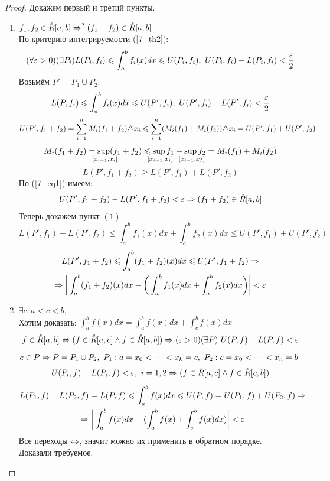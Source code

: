 \begin{proof}
	Докажем первый и третий пункты.\\
	\begin{enumerate}
	\item $f_1,f_2\in\mathring R[a,b]\Rightarrow^?(f_1+f_2)\in\mathring R[a,b]$\\
	По критерию интегрируемости (\ref{7_th2}):
	\[(\forall\eps>0)(\exists P_i)L(P_i,f_i)\le\int_a^bf_i(x)dx\le U(P_i,f_i),\ U(P_i,f_i)-L(P_i,f_i)<\frac\eps2\] 
	Возьмём $P'=P_1\cup P_2$.
	\begin{equation}\label{7_eq1}
		L(P,f_i)\le\int_a^bf_i(x)dx\le U(P',f_i),\ U(P',f_i)-L(P',f_i)<\frac\eps2\\
	\end{equation}
	\[U(P',f_1+f_2)=\sum_{i=1}^nM_i(f_1+f_2)\tr x_i\le\sum_{i=1}^n(M_i(f_1)+M_i(f_2))\tr x_i=U(P',f_1)+U(P',f_2)\]
	\[M_i(f_1+f_2)=\smo{\sup_{\hspace{0.1cm}[x_{i-1},x_i]}}(f_1+f_2)\le\smo{\sup_{\hspace{0.1cm}[x_{i-1},x_i]}}f_1+\smo{\sup_{\hspace{0.1cm}[x_{i-1},x_I]}}f_2=M_i(f_1)+M_i(f_2)\]
	\[L(P',f_1+f_2)\ge L(P',f_1)+L(P',f_2)\]
	По (\ref{7_eq1}) имеем:
	\[U(P',f_1+f_2)-L(P',f_1+f_2)<\varepsilon\Rightarrow (f_1+f_2)\in\mathring R[a,b]\]
	Теперь докажем пункт $(1)$.\\
	\[L(P',f_1)+L(P',f_2)\le\int_a^bf_1(x)dx+\int_a^bf_2(x)dx\le U(P',f_1)+U(P',f_2)\]
	\begin{multline*}
		L(P',f_1+f_2)\leqslant\int_a^b(f_1+f_2)(x)dx\leqslant U(P',f_1+f_2)\Rightarrow\\
		\Rightarrow\bigg|\int_a^b(f_1+f_2)(x)dx-\bigg(\int_a^bf_1(x)dx+\int_a^bf_2(x)dx\bigg)\bigg|<\varepsilon
	\end{multline*}
	\item[3.] $\exists c: a<c<b,$\\ 
	Хотим доказать: $\displaystyle\int_a^bf(x)dx=\int_a^bf(x)dx+\int_c^bf(x)dx$
	\[f\in\mathring R[a,b]\Leftrightarrow(f\in\mathring R[a,c]\land f\in\mathring R[a,b])\Rightarrow(\varepsilon>0)(\exists P)\ U(P,f)-L(P,f)<\varepsilon\]
	$c\in P\Ra P=P_1\cup P_2,\ P_1:a=x_0<\dots<x_k=c,\ P_2:c=x_0<\dots<x_n=b$\\
	\[U(P_i,f)-L(P_i,f)<\varepsilon,\ i=1,2\Rightarrow (f\in\mathring R[a,c]\land f\in\mathring R[c,b])\]
	\begin{multline*}
		L(P_1,f)+L(P_2,f)=L(P,f)\leqslant\int_a^bf(x)dx\leqslant U(P,f)=U(P_1,f)+U(P_2,f)\Rightarrow\\
		\Rightarrow\bigg|\int_a^bf(x)dx-(\int_a^bf(x)+\int_c^bf(x)dx)\bigg|<\varepsilon
	\end{multline*}
	Все переходы $\Leftrightarrow$, значит можно их применить в обратном порядке.\\ 
	Доказали требуемое.
	\end{enumerate}
\end{proof}